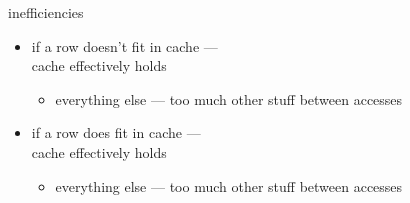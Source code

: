 
\begin{frame}{inefficiencies}
    \begin{itemize}
        \item if a row doesn't fit in cache --- \\
            cache effectively holds 
            \begin{itemize}
            \item everything else --- too much other stuff between accesses
            \end{itemize}
        \vspace{.5cm}
        \item if a row does fit in cache --- \\
            cache effectively holds 
            \begin{itemize}
            \item everything else --- too much other stuff between accesses
            \end{itemize}
    \end{itemize}
\end{frame}
